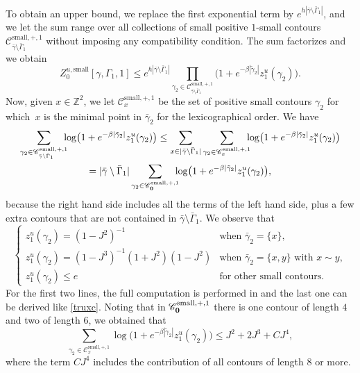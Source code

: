 \documentclass[JEP,XML,SOM,Unicode, NoFloatCountersInSection]{cedram}
\let\mathcal\mathscr
\numberwithin{equation}{section}
\theoremstyle{plain}
\theoremstyle{definition}
\newcommand{\sm}{\mathrm{small}}
\newcommand{\cC}{{\ensuremath{\mathcal C}} }
\newcommand{\bbZ}{{\ensuremath{\mathbb Z}} }
\newcommand{\gb}{\beta}
\newcommand{\gG}{\Gamma}
\begin{document}
To obtain an upper bound, we replace the first exponential term by $e^{h|\bar \gamma \setminus \bar \gG_1|}$, and we let the sum range over all collections of small
positive $1$-small contours
$\cC^{\sm,+,1}_{\bar \gamma\setminus \bar \gG_1}$ without imposing any compatibility condition.
The sum factorizes and we obtain
\begin{equation*}
Z^{u,\sm}_{0}[\gamma,\gG_1,1]\le
e^{h|\bar \gamma \setminus \bar \gG_1|} \prod_{\gamma_2 \in \cC^{\sm,+,1}_{\bar \gamma\setminus \bar \gG_1}}
\bigl(1+ e^{-\gb |\tilde\gamma_2|}
z^u_{1}(\gamma_2) \bigr).
\end{equation*}
Now, given $x\in \bbZ^2$, we let $\cC^{\sm,+,1}_x$ be the set of positive small contours $\gamma_2$ for which~$x$ is the minimal point in $\bar \gamma_2$ for the lexicographical order.
We have
\begin{multline*}
\sum_{ \gamma_2 \in \cC^{\sm,+,1}_{\bar \gamma\setminus \bar \gG_1}}\hspace*{-2mm} \log \bigl(1+ e^{-\gb |\tilde\gamma_2|}
z^u_{1}(\gamma_2)\bigr)\le \sum_{x\in |\bar \gamma\setminus \bar \gG_1|} \sum_{\gamma_2 \in \cC^{\sm,+,1}_x} \hspace*{-2mm}\log \bigl(1+ e^{-\gb |\tilde\gamma_2|}
z^u_{1}(\gamma_2)\bigr)\\
=|\bar \gamma\setminus \bar \gG_1| \sum_{\gamma_2 \in \cC^{\sm,+,1}_{\bf 0}} \hspace*{-2mm}\log \bigl(1+ e^{-\gb |\tilde\gamma_2|}
z^u_{1}(\gamma_2)\bigr),
\end{multline*}
because the right hand side includes all the terms of the left hand side, plus a few extra contours that are not contained in $\bar \gamma\setminus \bar \gG_1$.
We observe that
\begin{equation}\label{night}
\begin{cases}
z^u_{1}(\gamma_2)=(1-J^2)^{-1} & \text{when } \bar \gamma_2=\{x\},\\
z^u_{1}(\gamma_2)=(1-J^3)^{-1}(1+J^2)(1-J^2)& \text{when } \bar \gamma_2=\{x,y\} \text{ with } x\sim y,\\
z^u_{1}(\gamma_2)\le e & \text{for other small contours}.
\end{cases}
\end{equation}
For the first two lines, the full computation is performed in \cite[Proof of Lem.\,3.2]{cf:part1} and the last one can be derived like \eqref{truxc}.
Noting that in $\cC^{\sm,+,1}_{\bf 0}$ there is one contour of length $4$ and two of length $6$, we obtained that
\begin{equation*}
\sum_{\gamma_2 \in \cC^{\sm,+,1}_x}\log \bigl(1+ e^{-\gb |\tilde\gamma_2|}
z^u_{1}(\gamma_2)\bigr)\le J^2+2J^3+ C J^4,
\end{equation*}
where the term $CJ^4$ includes the contribution of all contours of length $8$ or more.
\end{document}

